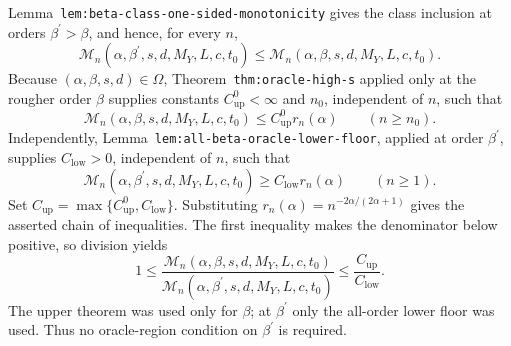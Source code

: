 Lemma~\texttt{lem:beta-class-one-sided-monotonicity} gives the class inclusion at orders \(\beta^{\prime}>\beta\), and hence, for every \(n\),
\[
\mathcal M_n(\alpha,\beta^{\prime},s,d,M_Y,L,c,t_0)
\le
\mathcal M_n(\alpha,\beta,s,d,M_Y,L,c,t_0).
\]
Because \((\alpha,\beta,s,d)\in\Omega\), Theorem~\texttt{thm:oracle-high-s} applied only at the rougher order \(\beta\) supplies constants \(C_{\mathrm{up}}^0<\infty\) and \(n_0\), independent of \(n\), such that
\[
\mathcal M_n(\alpha,\beta,s,d,M_Y,L,c,t_0)
\le C_{\mathrm{up}}^0r_n(\alpha)
\qquad(n\ge n_0).
\]
Independently, Lemma~\texttt{lem:all-beta-oracle-lower-floor}, applied at order \(\beta^{\prime}\), supplies \(C_{\mathrm{low}}>0\), independent of \(n\), such that
\[
\mathcal M_n(\alpha,\beta^{\prime},s,d,M_Y,L,c,t_0)
\ge C_{\mathrm{low}}r_n(\alpha)
\qquad(n\ge1).
\]
Set \(C_{\mathrm{up}}=\max\{C_{\mathrm{up}}^0,C_{\mathrm{low}}\}\). Substituting \(r_n(\alpha)=n^{-2\alpha/(2\alpha+1)}\) gives the asserted chain of inequalities. The first inequality makes the denominator below positive, so division yields
\[
1\le
\frac{\mathcal M_n(\alpha,\beta,s,d,M_Y,L,c,t_0)}
{\mathcal M_n(\alpha,\beta^{\prime},s,d,M_Y,L,c,t_0)}
\le\frac{C_{\mathrm{up}}}{C_{\mathrm{low}}}.
\]
The upper theorem was used only for \(\beta\); at \(\beta^{\prime}\) only the all-order lower floor was used. Thus no oracle-region condition on \(\beta^{\prime}\) is required.